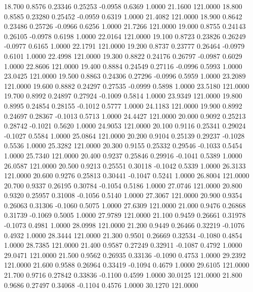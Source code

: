   18.700   0.8576   0.23346   0.25253  -0.0958   0.6369   1.0000  21.1600 121.0000
  18.800   0.8585   0.23280   0.25452  -0.0959   0.6319   1.0000  21.4082 121.0000
  18.900   0.8642   0.23486   0.25726  -0.0966   0.6256   1.0000  21.7266 121.0000
  19.000   0.8755   0.24143   0.26105  -0.0978   0.6198   1.0000  22.0164 121.0000
  19.100   0.8723   0.23826   0.26249  -0.0977   0.6165   1.0000  22.1791 121.0000
  19.200   0.8737   0.23777   0.26464  -0.0979   0.6101   1.0000  22.4998 121.0000
  19.300   0.8822   0.24176   0.26797  -0.0987   0.6029   1.0000  22.8606 121.0000
  19.400   0.8884   0.24549   0.27116  -0.0996   0.5993   1.0000  23.0425 121.0000
  19.500   0.8863   0.24306   0.27296  -0.0996   0.5959   1.0000  23.2089 121.0000
  19.600   0.8882   0.24297   0.27535  -0.0999   0.5898   1.0000  23.5180 121.0000
  19.700   0.8992   0.24897   0.27924  -0.1009   0.5814   1.0000  23.9349 121.0000
  19.800   0.8995   0.24854   0.28155  -0.1012   0.5777   1.0000  24.1183 121.0000
  19.900   0.8992   0.24697   0.28367  -0.1013   0.5713   1.0000  24.4427 121.0000
  20.000   0.9092   0.25213   0.28742  -0.1021   0.5620   1.0000  24.9053 121.0000
  20.100   0.9116   0.25341   0.29024  -0.1027   0.5584   1.0000  25.0864 121.0000
  20.200   0.9104   0.25139   0.29237  -0.1028   0.5536   1.0000  25.3282 121.0000
  20.300   0.9155   0.25332   0.29546  -0.1033   0.5454   1.0000  25.7340 121.0000
  20.400   0.9237   0.25846   0.29916  -0.1041   0.5389   1.0000  26.0587 121.0000
  20.500   0.9213   0.25551   0.30118  -0.1042   0.5339   1.0000  26.3133 121.0000
  20.600   0.9276   0.25813   0.30441  -0.1047   0.5241   1.0000  26.8004 121.0000
  20.700   0.9337   0.26195   0.30784  -0.1054   0.5186   1.0000  27.0746 121.0000
  20.800   0.9320   0.25957   0.31008  -0.1056   0.5140   1.0000  27.3067 121.0000
  20.900   0.9354   0.26063   0.31306  -0.1060   0.5075   1.0000  27.6309 121.0000
  21.000   0.9476   0.26868   0.31739  -0.1069   0.5005   1.0000  27.9789 121.0000
  21.100   0.9459   0.26661   0.31978  -0.1073   0.4981   1.0000  28.0998 121.0000
  21.200   0.9449   0.26466   0.32219  -0.1076   0.4932   1.0000  28.3444 121.0000
  21.300   0.9501   0.26669   0.32534  -0.1080   0.4854   1.0000  28.7385 121.0000
  21.400   0.9587   0.27249   0.32911  -0.1087   0.4792   1.0000  29.0471 121.0000
  21.500   0.9562   0.26935   0.33136  -0.1090   0.4753   1.0000  29.2392 121.0000
  21.600   0.9588   0.26964   0.33419  -0.1094   0.4679   1.0000  29.6105 121.0000
  21.700   0.9716   0.27842   0.33836  -0.1100   0.4599   1.0000  30.0125 121.0000
  21.800   0.9686   0.27497   0.34068  -0.1104   0.4576   1.0000  30.1270 121.0000
